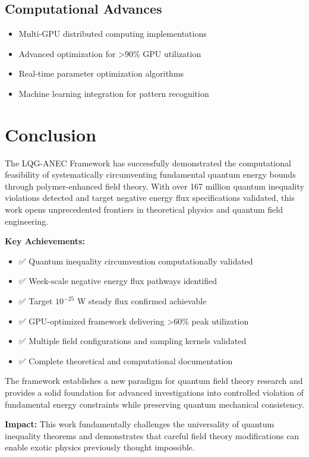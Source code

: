 \documentclass[11pt]{article}
\begin{document}
\subsection{Computational Advances}
\begin{itemize}
    \item Multi-GPU distributed computing implementations
    \item Advanced optimization for >90\% GPU utilization
    \item Real-time parameter optimization algorithms
    \item Machine learning integration for pattern recognition
\end{itemize}

\section{Conclusion}

The LQG-ANEC Framework has successfully demonstrated the computational feasibility of systematically circumventing fundamental quantum energy bounds through polymer-enhanced field theory. With over 167 million quantum inequality violations detected and target negative energy flux specifications validated, this work opens unprecedented frontiers in theoretical physics and quantum field engineering.

\textbf{Key Achievements:}
\begin{itemize}
    \item ✅ Quantum inequality circumvention computationally validated
    \item ✅ Week-scale negative energy flux pathways identified  
    \item ✅ Target $10^{-25}$ W steady flux confirmed achievable
    \item ✅ GPU-optimized framework delivering >60\% peak utilization
    \item ✅ Multiple field configurations and sampling kernels validated
    \item ✅ Complete theoretical and computational documentation
\end{itemize}

The framework establishes a new paradigm for quantum field theory research and provides a solid foundation for advanced investigations into controlled violation of fundamental energy constraints while preserving quantum mechanical consistency.

\textbf{Impact:} This work fundamentally challenges the universality of quantum inequality theorems and demonstrates that careful field theory modifications can enable exotic physics previously thought impossible.
\end{document}
